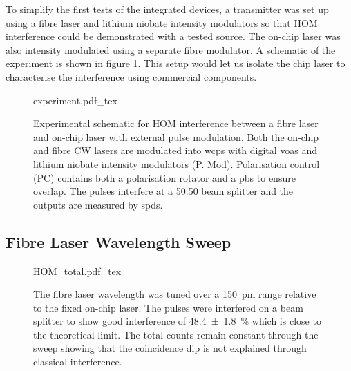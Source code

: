 To simplify the first tests of the integrated devices, a transmitter was set up using a fibre laser and lithium niobate intensity modulators so that \ac{HOM} interference could be demonstrated with a tested source. The on-chip laser was also intensity modulated using a separate fibre modulator. A schematic of the experiment is shown in figure \ref{fig:fibre_chip_exp}. This setup would let us isolate the chip laser to characterise the interference using commercial components.





\begin{figure}[t]
	\centering
	\def\svgwidth{\textwidth} 
	{experiment.pdf_tex}
	\caption[Fibre-chip HOM experimental setup]{Experimental schematic for \ac{HOM} interference between a fibre laser and on-chip laser with external pulse modulation. Both the on-chip and fibre \ac{CW} lasers are modulated into \acp{wcp} with digital \acp{voa} and lithium niobate intensity modulators (P. Mod). Polarisation control (PC) contains both a polarisation rotator and a \ac{pbs} to ensure overlap. The pulses interfere at a {50:50} beam splitter and the outputs are measured by \acp{spd}.}
	\label{fig:fibre_chip_exp}
\end{figure}

\subsection{Fibre Laser Wavelength Sweep}

\begin{figure}[p]
	\centering
	\small
	\def\svgwidth{0.9\textwidth} 
	{HOM_total.pdf_tex}
	\caption[Hong-Ou-Mandel interference between fibre components and chip]{The fibre laser wavelength was tuned over a \SI{150}{pm} range relative to the fixed on-chip laser. The pulses were interfered on a beam splitter to show good interference of \SI{48.4(18)}{\percent} which is close to the theoretical limit. The total counts remain constant through the sweep showing that the coincidence dip is not explained through classical interference.}
	\label{fig:fibre_wavelength_sweep}
\end{figure}


